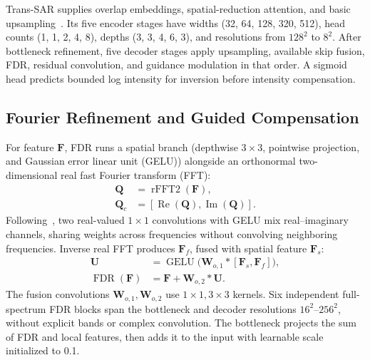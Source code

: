\documentclass[journal]{IEEEtran}
\newcommand{\vect}[1]{\bm{#1}}
\newcommand{\condensed}[1]{{\color{CondensedGreen}#1}}
\newcommand{\condensed}[1]{#1}
\begin{document}
Trans-SAR supplies overlap embeddings, spatial-reduction attention, and basic upsampling~\cite{perera2022}. Its five encoder stages have widths (32, 64, 128, 320, 512), head counts (1, 1, 2, 4, 8), depths (3, 3, 4, 6, 3), and resolutions from \(128^2\) to \(8^2\). After bottleneck refinement, five decoder stages apply upsampling, available skip fusion, FDR, residual convolution, and guidance modulation in that order. A sigmoid head predicts bounded log intensity for inversion before intensity compensation.

\subsection{Fourier Refinement and Guided Compensation}
For feature \(\vect{F}\), FDR runs a spatial branch (depthwise \(3\times3\), pointwise projection, and Gaussian error linear unit (GELU)) alongside an orthonormal two-dimensional real fast Fourier transform (FFT):
\begin{equation}
\begin{aligned}
\vect{Q} &= \operatorname{rFFT2}(\vect{F}),\\
\vect{Q}_{c} &= [\operatorname{Re}(\vect{Q}),
                   \operatorname{Im}(\vect{Q})].
\end{aligned}
\label{eq:fft}
\end{equation}
\condensed{Following~\cite{chi2020ffc}, two real-valued \(1\times1\) convolutions with GELU mix real--imaginary channels, sharing weights across frequencies without convolving neighboring frequencies. Inverse real FFT produces \(\vect{F}_f\), fused with spatial feature \(\vect{F}_s\):}
\begin{equation}
\begin{aligned}
\vect{U} &= \operatorname{GELU}
 \bigl(\vect{W}_{o,1} * [\vect{F}_{s},\vect{F}_{f}]\bigr),\\
\operatorname{FDR}(\vect{F})
 &= \vect{F}+\vect{W}_{o,2}*\vect{U}.
\end{aligned}
\label{eq:fdr}
\end{equation}
\condensed{The fusion convolutions \(\vect{W}_{o,1},\vect{W}_{o,2}\) use \(1\times1,3\times3\) kernels. Six independent full-spectrum FDR blocks span the bottleneck and decoder resolutions \(16^2\)--\(256^2\), without explicit bands or complex convolution. The bottleneck projects the sum of FDR and local features, then adds it to the input with learnable scale initialized to 0.1.}
\end{document}
